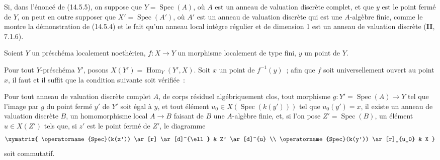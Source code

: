 \begin{remark}[14.5.7]
Si, dans l'énoncé de (14.5.5), on suppose que $Y=\operatorname{Spec}(A)$, où $A$ est un anneau
de valuation discrète complet, et que $y$ est le point fermé de $Y$, on peut en
outre supposer que $X'=\operatorname{Spec}(A')$, où $A'$ est un anneau de valuation discrète qui
est une $A$-algèbre finie, comme le montre la démonstration de (14.5.4) et le fait
qu'un anneau local intègre régulier et de dimension 1 est un anneau de valuation
discrète (\textbf{II}, 7.1.6).
\end{remark}

\begin{proposition}[14.5.8]
\label{IV.14.5.8-fr}
Soient $Y$ un préschéma localement noethérien, $f:X\to Y$ un morphisme localement
de type fini, $y$ un point de $Y$.

Pour tout $Y$-préschéma $Y'$, posons $X(Y')=\operatorname{Hom}_Y(Y',X)$. Soit $x$ un point de
$f^{-1}(y)$~; afin que $f$ soit universellement ouvert au point $x$, il faut et il
suffit que la condition suivante soit vérifiée~:

Pour tout anneau de valuation discrète complet $A$, de corps résiduel
algébriquement clos, tout morphisme $g:Y'=\operatorname{Spec}(A)\to Y$ tel que l'image par $g$ du
point fermé $y'$ de $Y'$ soit égal à $y$, et tout élément
$u_0\in X(\operatorname{Spec}(k(y')))$ tel que $u_0(y')=x$, il existe un anneau de valuation
discrète $B$, un homomorphisme local $A\to B$ faisant de $B$ une $A$-algèbre finie,
et, si l'on pose $Z'=\operatorname{Spec}(B)$, un élément $u\in X(Z')$ tels que, si $z'$ est le
point fermé de $Z'$, le diagramme
\[
  \xymatrix{
    \operatorname{Spec}(k(z')) \ar[r] \ar[d]^{\ell} & Z' \ar[d]^{u} \\
    \operatorname{Spec}(k(y')) \ar[r]_{u_0} & X
  }
\]
soit commutatif.
\end{proposition}


